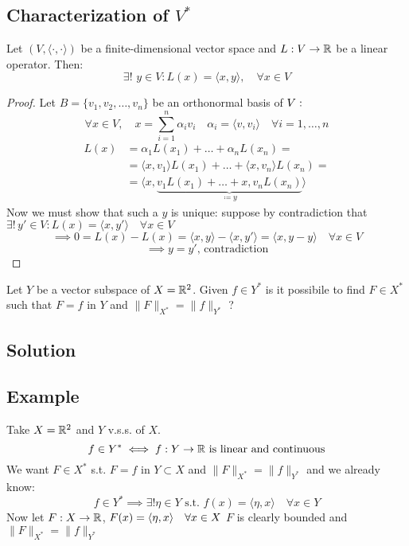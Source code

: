 \subsection{Characterization of \texorpdfstring{$V^*$}{V*}}
Let $(V,\langle \cdot,\cdot \rangle)$ be a finite-dimensional vector space and $L: V \to \mathbb{R} $ be a linear operator. Then:
\[
\exists ! \,\,y \in V: L(x) = \langle x,y \rangle ,\quad \forall x \in V
\]
\begin{proof}

Let $B = \{v_1,v_2,\dots,v_n\}$ be an orthonormal basis of $V: \\$
\[
\forall x \in V, \quad x = \displaystyle\sum_{i=1}^n \alpha_i v_i
\quad \alpha_i = \langle v,v_i \rangle \quad \forall i=1,\dots,n
\]
\begin{align*}
    L(x) & = \alpha_1 L(x_1) + \dots + \alpha_n L(x_n) = \\
         & = \langle x,v_1 \rangle L(x_1) + \dots + \langle x,v_n \rangle L(x_n) = \\
         & = \big\langle x,\underbrace{v_1 L(x_1) + \dots  +  x,v_n L(x_n) }_{\coloneqq y}\big\rangle 
\end{align*}
Now we must show that such a $y$ is unique: suppose by contradiction that $\exists ! \,y' \in V: L(x) = \langle x,y' \rangle \quad \forall x \in V $
\[
\implies 0 = L(x) - L(x) = \langle x,y \rangle - \langle x,y' \rangle = \langle x,y-y \rangle \quad \forall x \in  V
\]
\[
 \implies y=y' \text{, contradiction}
\]
    
\end{proof}



\question
Let $Y$ be a vector subspace of $X = \mathbb{R}^2$. Given $f \in Y^{*}$ is it possibile to find $F \in X^{*}$ such that $F = f$ in $Y$ and $\|F\|_{X^{*}} = \|f\|_{Y^{*}}$ ?

\subsection*{Solution}

\subsection{Example}

Take $X=\mathbb{R}^2$ and $Y$ v.s.s. of $X$.
\[
f \in Y^* \iff f:Y\to \mathbb{R} \text{ is linear and continuous}
\]
We want $F \in X^* $ s.t. $F=f$ in $Y \subset X$ and $\|F\|_{X^*}=\|f\|_{Y^*}$ and we already know:
\[
f \in Y^* \implies \exists ! \eta \in Y  \text{ s.t. } f(x) = \langle \eta, x \rangle \quad \forall x \in Y
\]
Now let $F: X\to \mathbb{R} $, $F(x)= \langle \eta, x \rangle\quad \forall x \in X\\$
$F$ is clearly bounded and $\|F\|_{X^*}=\|f\|_{Y^*}$

